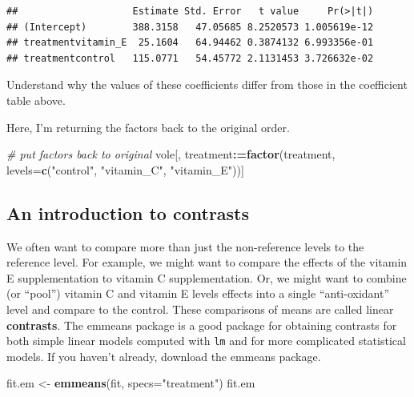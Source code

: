 \documentclass[]{book}
\newenvironment{Shaded}{\begin{snugshade}}{\end{snugshade}}
\newcommand{\CommentTok}[1]{\textcolor[rgb]{0.56,0.35,0.01}{\textit{#1}}}
\newcommand{\DataTypeTok}[1]{\textcolor[rgb]{0.13,0.29,0.53}{#1}}
\newcommand{\ErrorTok}[1]{\textcolor[rgb]{0.64,0.00,0.00}{\textbf{#1}}}
\newcommand{\KeywordTok}[1]{\textcolor[rgb]{0.13,0.29,0.53}{\textbf{#1}}}
\newcommand{\NormalTok}[1]{#1}
\newcommand{\OperatorTok}[1]{\textcolor[rgb]{0.81,0.36,0.00}{\textbf{#1}}}
\newcommand{\StringTok}[1]{\textcolor[rgb]{0.31,0.60,0.02}{#1}}
\begin{document}
\begin{verbatim}
##                    Estimate Std. Error   t value     Pr(>|t|)
## (Intercept)        388.3158   47.05685 8.2520573 1.005619e-12
## treatmentvitamin_E  25.1604   64.94462 0.3874132 6.993356e-01
## treatmentcontrol   115.0771   54.45772 2.1131453 3.726632e-02
\end{verbatim}

Understand why the values of these coefficients differ from those in the coefficient table above.

Here, I'm returning the factors back to the original order.

\begin{Shaded}
\begin{Highlighting}[]
\CommentTok{# put factors back to original}
\NormalTok{vole[, treatment}\OperatorTok{:}\ErrorTok{=}\KeywordTok{factor}\NormalTok{(treatment, }
                         \DataTypeTok{levels=}\KeywordTok{c}\NormalTok{(}\StringTok{"control"}\NormalTok{, }\StringTok{"vitamin_C"}\NormalTok{, }\StringTok{"vitamin_E"}\NormalTok{))]}
\end{Highlighting}
\end{Shaded}

\hypertarget{an-introduction-to-contrasts}{%
\subsection{An introduction to contrasts}\label{an-introduction-to-contrasts}}

We often want to compare more than just the non-reference levels to the reference level. For example, we might want to compare the effects of the vitamin E supplementation to vitamin C supplementation. Or, we might want to combine (or ``pool'') vitamin C and vitamin E levels effects into a single ``anti-oxidant'' level and compare to the control. These comparisons of means are called linear \textbf{contrasts}. The emmeans package is a good package for obtaining contrasts for both simple linear models computed with \texttt{lm} and for more complicated statistical models. If you haven't already, download the emmeans package.

\begin{Shaded}
\begin{Highlighting}[]
\NormalTok{fit.em <-}\StringTok{ }\KeywordTok{emmeans}\NormalTok{(fit, }\DataTypeTok{specs=}\StringTok{"treatment"}\NormalTok{)}
\NormalTok{fit.em}
\end{Highlighting}
\end{Shaded}
\end{document}
